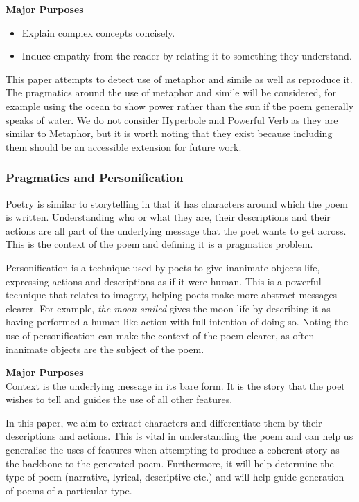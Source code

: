 \textbf{Major Purposes}
\begin{itemize}
\item{Explain complex concepts concisely.}
\item{Induce empathy from the reader by relating it to something they understand.}
\end{itemize} 

This paper attempts to detect use of metaphor and simile as well as reproduce it. The pragmatics around the use of metaphor and simile will be considered, for example using the ocean to show power rather than the sun if the poem generally speaks of water. We do not consider Hyperbole and Powerful Verb as they are similar to Metaphor, but it is worth noting that they exist because including them should be an accessible extension for future work.

\subsubsection{Pragmatics and Personification}
\label{sec:pragpers}
Poetry is similar to storytelling in that it has characters around which the poem is written. Understanding who or what they are, their descriptions and their actions are all part of the underlying message that the poet wants to get across. This is the context of the poem and defining it is a pragmatics problem.

Personification is a technique used by poets to give inanimate objects life, expressing actions and descriptions as if it were human. This is a powerful technique that relates to imagery, helping poets make more abstract messages clearer. For example, \textit{the moon smiled} gives the moon life by describing it as having performed a human-like action with full intention of doing so. Noting the use of personification can make the context of the poem clearer, as often inanimate objects are the subject of the poem.

\textbf{Major Purposes}\\
Context is the underlying message in its bare form. It is the story that the poet wishes to tell and guides the use of all other features.

In this paper, we aim to extract characters and differentiate them by their descriptions and actions. This is vital in understanding the poem and can help us generalise the uses of features when attempting to produce a coherent story as the backbone to the generated poem. Furthermore, it will help determine the type of poem (narrative, lyrical, descriptive etc.) and will help guide generation of poems of a particular type. 

